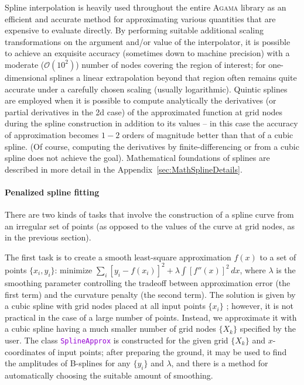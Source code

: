 \documentclass[12pt]{article}
\newcommand{\Agama}{\textsc{Agama}\xspace}
\newcommand{\ttt}[1]{\textcolor{darkviolet}{\texttt{#1}}}
\begin{document}
Spline interpolation is heavily used throughout the entire \Agama library as an efficient and accurate method for approximating various quantities that are expensive to evaluate directly. By performing suitable additional scaling transformations on the argument and/or value of the interpolator, it is possible to achieve an exquisite accuracy (sometimes down to machine precision) with a moderate ($\mathcal O(10^2)$) number of nodes covering the region of interest; for one-dimensional splines a linear extrapolation beyond that region often remains quite accurate under a carefully chosen scaling (usually logarithmic). Quintic splines are employed when it is possible to compute analytically the derivatives (or partial derivatives in the 2d case) of the approximated function at grid nodes during the spline construction in addition to its values -- in this case the accuracy of approximation becomes $1-2$ orders of magnitude better than that of a cubic spline. (Of course, computing the derivatives by finite-differencing or from a cubic spline does not achieve the goal).
Mathematical foundations of splines are described in more detail in the Appendix~\ref{sec:MathSplineDetails}.

\paragraph{Penalized spline fitting}  \label{sec:SplineFitting}
There are two kinds of tasks that involve the construction of a spline curve from an irregular set of points (as opposed to the values of the curve at grid nodes, as in the previous section).

The first task is to create a smooth least-square approximation $f(x)$ to a set of points $\{x_i, y_i\}$: 
minimize $\sum_i [y_i-f(x_i)]^2 + \lambda \int [f''(x)]^2\,dx$, where $\lambda$ is the smoothing parameter controlling the tradeoff between approximation error (the first term) and the curvature penalty (the second term). The solution is given by a cubic spline with grid nodes placed at all input points $\{x_i\}$ \cite{GreenSilverman}; however, it is not practical in the case of a large number of points. Instead, we approximate it with a cubic spline having a much smaller number of grid nodes $\{X_k\}$ specified by the user. The class \ttt{SplineApprox} is constructed for the given grid  $\{X_k\}$ and $x$-coordinates of input points; after preparing the ground, it may be used to find the amplitudes of B-splines for any $\{y_i\}$ and $\lambda$, and there is a method for automatically choosing the suitable amount of smoothing.
\end{document}
